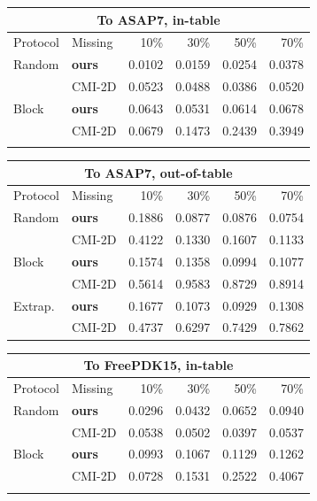 \small
\begin{tabular}{llrrrr}\toprule
\multicolumn{6}{c}{To ASAP7, in-table} \\\midrule
Protocol & Missing & 10\% & 30\% & 50\% & 70\% \\\midrule
Random & \textbf{ours} & 0.0102 & 0.0159 & 0.0254 & 0.0378 \\
 & CMI-2D & 0.0523 & 0.0488 & 0.0386 & 0.0520 \\
\addlinespace
Block & \textbf{ours} & 0.0643 & 0.0531 & 0.0614 & 0.0678 \\
 & CMI-2D & 0.0679 & 0.1473 & 0.2439 & 0.3949 \\
\addlinespace
\bottomrule\end{tabular}

\vspace{2pt}

\begin{tabular}{llrrrr}\toprule
\multicolumn{6}{c}{To ASAP7, out-of-table} \\\midrule
Protocol & Missing & 10\% & 30\% & 50\% & 70\% \\\midrule
Random & \textbf{ours} & 0.1886 & 0.0877 & 0.0876 & 0.0754 \\
 & CMI-2D & 0.4122 & 0.1330 & 0.1607 & 0.1133 \\
\addlinespace
Block & \textbf{ours} & 0.1574 & 0.1358 & 0.0994 & 0.1077 \\
 & CMI-2D & 0.5614 & 0.9583 & 0.8729 & 0.8914 \\
\addlinespace
Extrap. & \textbf{ours} & 0.1677 & 0.1073 & 0.0929 & 0.1308 \\
 & CMI-2D & 0.4737 & 0.6297 & 0.7429 & 0.7862 \\
\bottomrule\end{tabular}

\vspace{2pt}

\begin{tabular}{llrrrr}\toprule
\multicolumn{6}{c}{To FreePDK15, in-table} \\\midrule
Protocol & Missing & 10\% & 30\% & 50\% & 70\% \\\midrule
Random & \textbf{ours} & 0.0296 & 0.0432 & 0.0652 & 0.0940 \\
 & CMI-2D & 0.0538 & 0.0502 & 0.0397 & 0.0537 \\
\addlinespace
Block & \textbf{ours} & 0.0993 & 0.1067 & 0.1129 & 0.1262 \\
 & CMI-2D & 0.0728 & 0.1531 & 0.2522 & 0.4067 \\
\addlinespace
\bottomrule\end{tabular}

